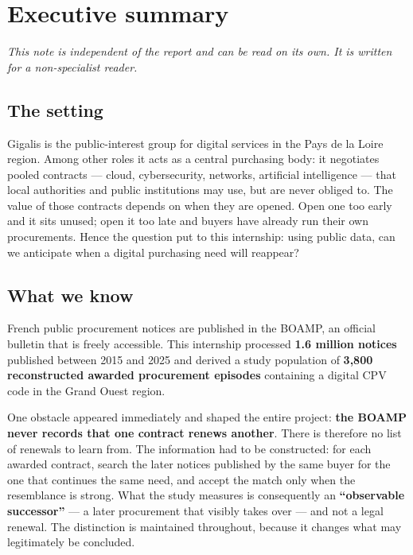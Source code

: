 \section*{Executive summary}

\emph{This note is independent of the report and can be read on its own. It is written for a non-specialist reader.}



\subsection*{The setting}

Gigalis is the public-interest group for digital services in the Pays de la Loire region. Among other roles it acts as a central purchasing body: it negotiates pooled contracts --- cloud, cybersecurity, networks, artificial intelligence --- that local authorities and public institutions may use, but are never obliged to. The value of those contracts depends on when they are opened. Open one too early and it sits unused; open it too late and buyers have already run their own procurements. Hence the question put to this internship: using public data, can we anticipate when a digital purchasing need will reappear?

\subsection*{What we know}

French public procurement notices are published in the BOAMP, an official bulletin that is freely accessible. This internship processed \textbf{1.6 million notices} published between 2015 and 2025 and derived a study population of \textbf{3,800 reconstructed awarded procurement episodes} containing a digital CPV code in the Grand Ouest region.

One obstacle appeared immediately and shaped the entire project: \textbf{the BOAMP never records that one contract renews another}. There is therefore no list of renewals to learn from. The information had to be constructed: for each awarded contract, search the later notices published by the same buyer for the one that continues the same need, and accept the match only when the resemblance is strong. What the study measures is consequently an \textbf{``observable successor''} --- a later procurement that visibly takes over --- and not a legal renewal. The distinction is maintained throughout, because it changes what may legitimately be concluded.

